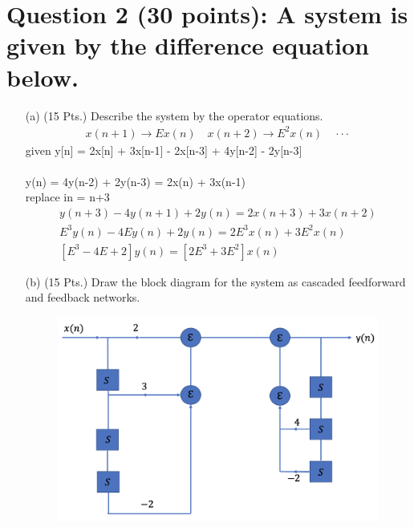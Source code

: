 \documentclass[a4paper, 11pt]{report}
\begin{document}
{\section*{\textbf{Question 2 (30 points): A system is given by the difference equation below.}}
\begin{itemize}
\item[(a)] (15 Pts.) Describe the system by the operator equations.
\begin{align*}
x(n+1) \rightarrow Ex(n) \quad x(n+2) \rightarrow E^2x(n) \quad \cdot \cdot \cdot
\end{align*}
given y[n] = 2x[n] + 3x[n-1] - 2x[n-3] + 4y[n-2] - 2y[n-3]
\\ \\
y(n) = 4y(n-2) + 2y(n-3) = 2x(n) + 3x(n-1)
\\ replace in = n+3
\begin{align*}
y(n+3) - 4y(n+1) + 2y(n) = 2x(n+3) + 3x(n+2) \\
E^3 y(n) - 4E y(n) + 2y(n)  = 2E^3 x(n) + 3E^2 x(n) \\
[E^3 - 4E + 2]y(n) = [2E^3 + 3E^2]x(n)
\end{align*}
\item[(b)] (15 Pts.) Draw the block diagram for the system as cascaded feedforward and
feedback networks.
\begin{figure}[h]
\includegraphics[scale=.29]{1.png}
\centering
\end{figure}
\end{itemize}
\newpage
}
\end{document}
